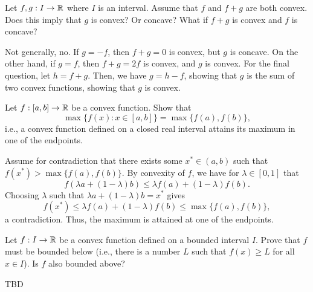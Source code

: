 \begin{exercise}
  Let $f, g : I \to \mathbb{R}$ where $I$ is an interval.
  Assume that $f$ and $f + g$ are both convex.
  Does this imply that $g$ is convex?
  Or concave?
  What if $f + g$ is convex and $f$ is concave?
\end{exercise}

\begin{solution}
  Not generally, no.
  If $g = -f$, then $f + g = 0$ is convex, but $g$ is concave.
  On the other hand, if $g = f$, then $f + g = 2f$ is convex, and $g$ is convex.
  For the final question, let $h = f + g$.
  Then, we have $g = h - f$, showing that $g$ is the sum of two convex functions, showing that $g$ is convex.
\end{solution}

\begin{exercise}
  Let $f : [a, b] \to \mathbb{R}$ be a convex function.
  Show that
  \begin{equation}
    \max\{ f(x) : x \in [a, b] \} = \max\{ f(a), f(b) \},
  \end{equation}
  i.e., a convex function defined on a closed real interval attains its maximum in one of the endpoints.
\end{exercise}

\begin{solution}
  Assume for contradiction that there exists some $x^* \in (a, b)$ such that $f(x^*) > \max\{ f(a), f(b) \}$.
  By convexity of $f$, we have for $\lambda \in [0, 1]$ that
  \begin{equation}
    f( \lambda a + (1 - \lambda) b )
    \leq
    \lambda f(a) + (1 - \lambda) f(b).
  \end{equation}
  Choosing $\lambda$ such that $\lambda a + (1 - \lambda) b = x^*$ gives
  \begin{equation}
    f(x^*)
    \leq
    \lambda f(a) + (1 - \lambda) f(b)
    \leq
    \max\{ f(a), f(b) \},
  \end{equation}
  a contradiction.
  Thus, the maximum is attained at one of the endpoints.
\end{solution}

\begin{exercise}
  Let $f : I \to \mathbb{R}$ be a convex function defined on a bounded interval $I$.
  Prove that $f$ must be bounded below (i.e., there is a number $L$ such that $f(x) \geq L$ for all $x \in I$).
  Is $f$ also bounded above?
\end{exercise}

\begin{solution}
  TBD
\end{solution}
